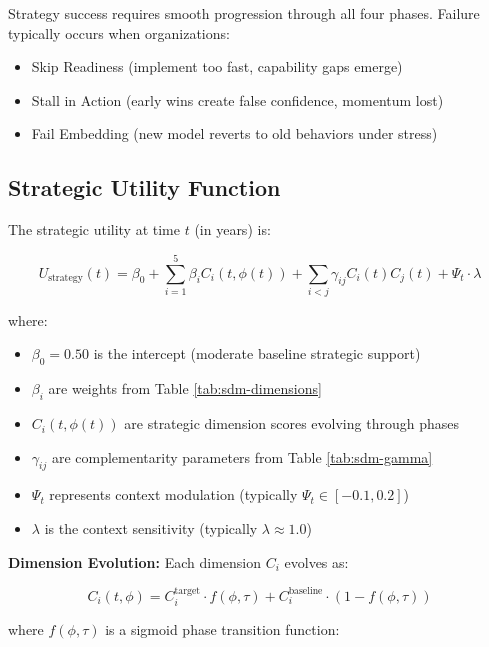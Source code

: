 Strategy success requires smooth progression through all four phases. Failure typically occurs when organizations:
\begin{itemize}
    \item Skip Readiness (implement too fast, capability gaps emerge)
    \item Stall in Action (early wins create false confidence, momentum lost)
    \item Fail Embedding (new model reverts to old behaviors under stress)
\end{itemize}

\subsection{Strategic Utility Function}
\label{subsec:sdm-utility}

The strategic utility at time $t$ (in years) is:

\begin{equation}
\label{eq:sdm-utility}
U_{\text{strategy}}(t) = \beta_0 + \sum_{i=1}^{5} \beta_i C_i(t, \phi(t)) + \sum_{i<j} \gamma_{ij} C_i(t) C_j(t) + \Psi_t \cdot \lambda
\end{equation}

where:
\begin{itemize}
    \item $\beta_0 = 0.50$ is the intercept (moderate baseline strategic support)
    \item $\beta_i$ are weights from Table \ref{tab:sdm-dimensions}
    \item $C_i(t, \phi(t))$ are strategic dimension scores evolving through phases
    \item $\gamma_{ij}$ are complementarity parameters from Table \ref{tab:sdm-gamma}
    \item $\Psi_t$ represents context modulation (typically $\Psi_t \in [-0.1, 0.2]$)
    \item $\lambda$ is the context sensitivity (typically $\lambda \approx 1.0$)
\end{itemize}

\textbf{Dimension Evolution:} Each dimension $C_i$ evolves as:

\begin{equation}
\label{eq:sdm-dimension-evolution}
C_i(t, \phi) = C_i^{\text{target}} \cdot f(\phi, \tau) + C_i^{\text{baseline}} \cdot (1 - f(\phi, \tau))
\end{equation}

where $f(\phi, \tau)$ is a sigmoid phase transition function:

